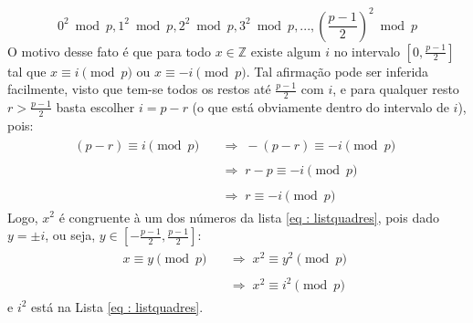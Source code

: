 \begin{equation} \label{eq : listquadres}
    0^2 \bmod{p}, 1^2 \bmod{p}, 2^2 \bmod{p}, 3^2 \bmod{p}, ..., \left(\frac{p -1}{2} \right)^2 \bmod{p} 
\end{equation}
O motivo desse fato é que para todo $x \in \mathbb{Z}$ existe algum $i$ no intervalo $\left[0, \frac{p-1}{2}\right]$ tal que $x \equiv i \pmod p $ ou $ x \equiv -i \pmod p$.
Tal afirmação pode ser inferida facilmente, visto que tem-se todos os restos até $\frac{p-1}{2}$ 
com $i$, e para qualquer resto $r > \frac{p-1}{2}$ basta escolher $i = p - r$ (o que está obviamente dentro do intervalo de $i$), pois:
\begin{align*}
    (p - r) \equiv i \pmod p
    &\begin{aligned}
        \;\; \Longrightarrow \; -(p - r) \equiv -i \pmod p
    \end{aligned} \\
    &\begin{aligned}
        \;\; \Longrightarrow \; r - p \equiv -i \pmod p
    \end{aligned} \\
    &\begin{aligned}
        \;\; \Longrightarrow \; r \equiv -i \pmod p
    \end{aligned}
\end{align*}
Logo, $x^2$ é congruente à um dos números da lista \ref{eq : listquadres}, pois dado $y = \pm i$, ou seja, $y \in \left[- \frac{p-1}{2}, \frac{p-1}{2}\right]$:
\begin{align*}
    x \equiv y \pmod p
    &\begin{aligned}
        \;\; \Longrightarrow \; x^2 \equiv y^2 \pmod p
    \end{aligned} \\
    &\begin{aligned}
        \;\; \Longrightarrow \; x^2 \equiv i^2 \pmod p
    \end{aligned}
\end{align*}
e $i^2$ está na Lista \ref{eq : listquadres}.

